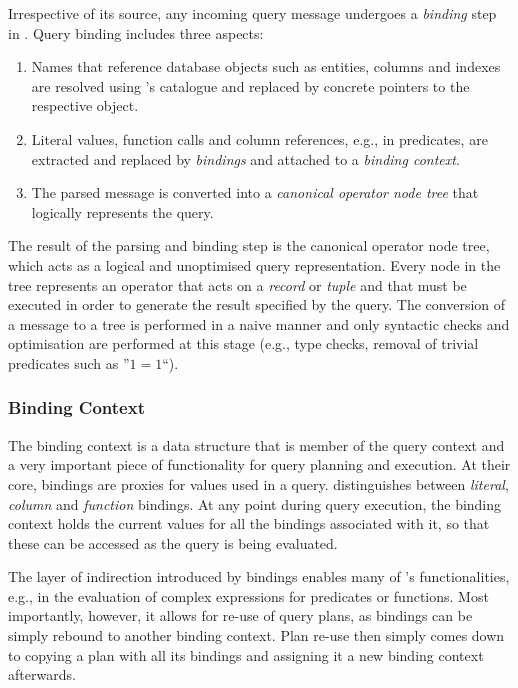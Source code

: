 Irrespective of its source, any incoming query message undergoes a \emph{binding} step in \cottontail{}. Query binding includes three aspects:

\begin{enumerate}
    \item Names that reference database objects such as entities, columns and indexes are resolved using \cottontail{}'s catalogue and replaced by concrete pointers to the respective object.
    \item Literal values, function calls and column references, e.g., in predicates, are extracted and replaced by \emph{bindings} and attached to a \emph{binding context}.
    \item The parsed message is converted into a \emph{canonical operator node tree} that logically represents the query.
\end{enumerate}

The result of the parsing and binding step is the canonical operator node tree, which acts as a logical and unoptimised query representation.  Every node in the tree represents an operator that acts on a \emph{record} or \emph{tuple} and that must be executed in order to generate the result specified by the query. The conversion of a message to a tree is performed in a naive manner and only syntactic checks and optimisation are performed at this stage (e.g., type checks, removal of trivial predicates such as ''$1 = 1$``).

\subsubsection{Binding Context}
The binding context is a data structure that is member of the query context and a very important piece of functionality for query planning and execution. At their core, bindings are proxies for values used in a query. \cottontail{} distinguishes between \emph{literal}, \emph{column} and \emph{function} bindings. At any point during query execution, the binding context holds the current values for all the bindings associated with it, so that these can be accessed as the query is being evaluated.

The layer of indirection introduced by bindings enables many of \cottontail{}'s functionalities, e.g., in the evaluation of complex expressions for predicates or functions. Most importantly, however, it allows for re-use of query plans, as bindings can be simply rebound to another binding context. Plan re-use then simply comes down to copying a plan with all its bindings and assigning it a new binding context afterwards. 

